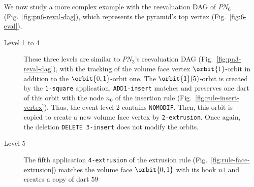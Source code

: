 We now study 
a more complex example %
with the reevaluation DAG of $PN_{6}$ (Fig.~\ref{fig:pn6-reval-dag}),
which represents the pyramid's top vertex (Fig.~\ref{fig:6-eval}). %
\begin{description}
  \item[Level 1 to 4] 
  These three levels are similar to $PN_3$'s reevaluation DAG (Fig.~\ref{fig:pn3-reval-dag}), with the tracking of the volume face vertex $\orbit{1}$-orbit in addition to the $\orbit{0,1}$-orbit one. %
  The $\orbit{1}(5)$-orbit is crea\-ted by the \texttt{1-square} application. %
  \texttt{ADD1-insert} matches and preserves one dart of this orbit with the node $n_{0}$ of the insertion rule (Fig.~\ref{fig:rule-insert-vertex}).
  Thus, the event level 2 contains \texttt{NOMODIF}.
  Then, this orbit is copied to create a new volume face vertex by \texttt{2-extrusion}.
  Once again, the deletion \texttt{DELETE 3-insert} does not modify the orbits.
  \item[Level 5] The fifth application \texttt{4-extrusion} of the extrusion rule (Fig.~\ref{fig:rule-face-extrusion}) matches the volume face $\orbit{0,1}$ with its hook $n1$ and creates a copy of dart $59$ %

\end{description}
